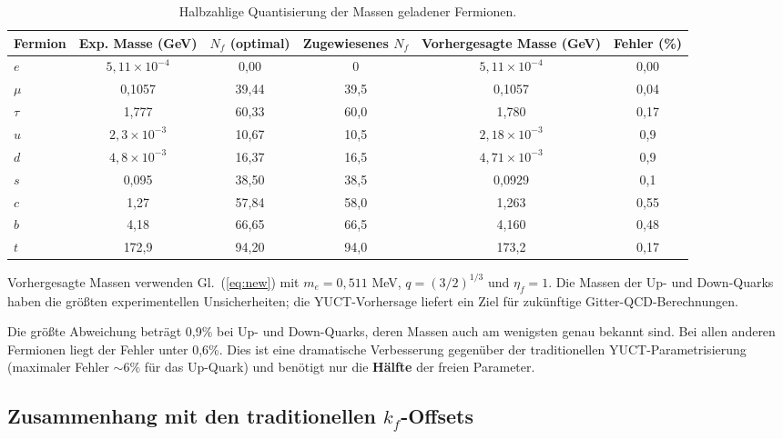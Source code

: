 \documentclass[12pt,a4paper]{article}
\begin{document}
	\begin{table}[H]
		\centering
		\caption{Halbzahlige Quantisierung der Massen geladener Fermionen.}
		\label{tab:new_masses}
		\small
		\begin{tabular}{l c c c c c}
			\toprule
			Fermion & Exp. Masse (GeV) & \(N_f\) (optimal) & Zugewiesenes \(N_f\) & Vorhergesagte Masse (GeV) & Fehler (\%) \\
			\midrule
			\(e\)   & \(5,11\times10^{-4}\) & 0,00  & 0      & \(5,11\times10^{-4}\) & 0,00 \\
			\(\mu\)  & 0,1057                & 39,44 & 39,5   & 0,1057               & 0,04 \\
			\(\tau\) & 1,777                 & 60,33 & 60,0   & 1,780                & 0,17 \\
			\(u\)   & \(2,3\times10^{-3}\)    & 10,67 & 10,5   & \(2,18\times10^{-3}\)  & 0,9 \\
			\(d\)   & \(4,8\times10^{-3}\)    & 16,37 & 16,5   & \(4,71\times10^{-3}\)  & 0,9 \\
			\(s\)   & 0,095                 & 38,50 & 38,5   & 0,0929               & 0,1 \\
			\(c\)   & 1,27                  & 57,84 & 58,0   & 1,263                & 0,55 \\
			\(b\)   & 4,18                  & 66,65 & 66,5   & 4,160                & 0,48 \\
			\(t\)   & 172,9                 & 94,20 & 94,0   & 173,2                & 0,17 \\
			\bottomrule
		\end{tabular}
		\par\smallskip
		\footnotesize Vorhergesagte Massen verwenden Gl.~(\ref{eq:new}) mit \(m_e = 0,511\) MeV, \(q = (3/2)^{1/3}\) und \(\eta_f = 1\). Die Massen der Up- und Down-Quarks haben die größten experimentellen Unsicherheiten; die YUCT-Vorhersage liefert ein Ziel für zukünftige Gitter-QCD-Berechnungen.
	\end{table}
	
	Die größte Abweichung beträgt 0,9\% bei Up- und Down-Quarks, deren Massen auch am wenigsten genau bekannt sind. Bei allen anderen Fermionen liegt der Fehler unter 0,6\%. Dies ist eine dramatische Verbesserung gegenüber der traditionellen YUCT-Parametrisierung (maximaler Fehler \(\sim 6\%\) für das Up-Quark) und benötigt nur die \textbf{Hälfte} der freien Parameter.
	
	\subsection{Zusammenhang mit den traditionellen \(k_f\)-Offsets}
	
\end{document}
